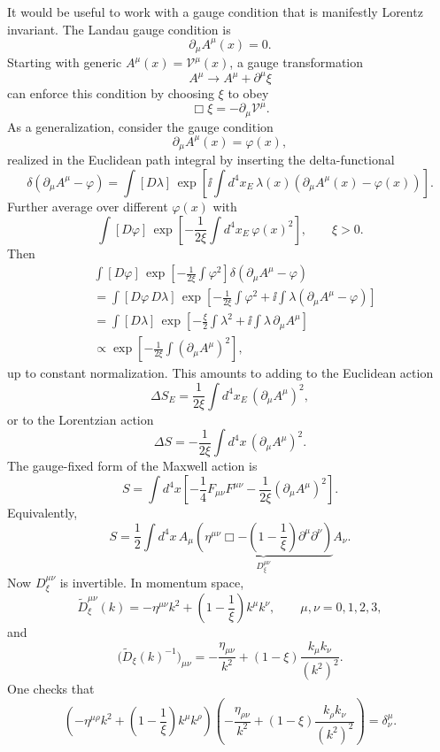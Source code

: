 It would be useful to work with a gauge condition that is manifestly
Lorentz invariant.  The Landau gauge condition is
\[
  \partial_\mu A^\mu(x)=0.
\]
Starting with generic \(A^\mu(x)=\mathcal V^\mu(x)\), a gauge
transformation
\[
  A^\mu\to A^\mu+\partial^\mu\xi
\]
can enforce this condition by choosing \(\xi\) to obey
\[
  \Box\xi=-\partial_\mu\mathcal V^\mu.
\]
As a generalization, consider the gauge condition
\[
  \partial_\mu A^\mu(x)=\varphi(x),
\]
realized in the Euclidean path integral by inserting the delta-functional
\[
  \delta(\partial_\mu A^\mu-\varphi)
  =
  \int[D\lambda]\,
  \exp\left[
    \ii\int d^4x_E\,
    \lambda(x)(\partial_\mu A^\mu(x)-\varphi(x))
  \right].
\]
Further average over different \(\varphi(x)\) with
\[
  \int[D\varphi]\,
  \exp\left[
    -\frac{1}{2\xi}
    \int d^4x_E\,\varphi(x)^2
  \right],
  \qquad \xi>0.
\]
Then
\[
\begin{aligned}
  &\int[D\varphi]\,
  \exp\left[-\frac{1}{2\xi}\int\varphi^2\right]
  \delta(\partial_\mu A^\mu-\varphi)
\\
  &=
  \int[D\varphi\,D\lambda]\,
  \exp\left[
    -\frac{1}{2\xi}\int\varphi^2
    +\ii\int\lambda(\partial_\mu A^\mu-\varphi)
  \right]
\\
  &=
  \int[D\lambda]\,
  \exp\left[
    -\frac{\xi}{2}\int\lambda^2
    +\ii\int\lambda\,\partial_\mu A^\mu
  \right]
\\
  &\propto
  \exp\left[
    -\frac{1}{2\xi}
    \int(\partial_\mu A^\mu)^2
  \right],
\end{aligned}
\]
up to constant normalization.  This amounts to adding to the Euclidean
action
\[
  \Delta S_E
  =
  \frac{1}{2\xi}
  \int d^4x_E\,(\partial_\mu A^\mu)^2,
\]
or to the Lorentzian action
\[
  \Delta S
  =
  -\frac{1}{2\xi}
  \int d^4x\,(\partial_\mu A^\mu)^2.
\]
The gauge-fixed form of the Maxwell action is
\[
  S=
  \int d^4x
  \left[
    -\frac14 F_{\mu\nu}F^{\mu\nu}
    -\frac{1}{2\xi}(\partial_\mu A^\mu)^2
  \right].
\]
Equivalently,
\[
  S
  =
  \frac12\int d^4x\,
  A_\mu
  \underbrace{
    \left(
      \eta^{\mu\nu}\Box
      -\left(1-\frac1\xi\right)\partial^\mu\partial^\nu
    \right)
  }_{D_\xi^{\mu\nu}}
  A_\nu.
\]
Now \(D_\xi^{\mu\nu}\) is invertible.  In momentum space,
\[
  \widetilde D_\xi^{\mu\nu}(k)
  =
  -\eta^{\mu\nu}k^2
  +\left(1-\frac1\xi\right)k^\mu k^\nu,
  \qquad
  \mu,\nu=0,1,2,3,
\]
and
\[
  \bigl(\widetilde D_\xi(k)^{-1}\bigr)_{\mu\nu}
  =
  -\frac{\eta_{\mu\nu}}{k^2}
  +(1-\xi)\frac{k_\mu k_\nu}{(k^2)^2}.
\]
One checks that
\[
  \left(
    -\eta^{\mu\rho}k^2
    +\left(1-\frac1\xi\right)k^\mu k^\rho
  \right)
  \left(
    -\frac{\eta_{\rho\nu}}{k^2}
    +(1-\xi)\frac{k_\rho k_\nu}{(k^2)^2}
  \right)
  =
  \delta^\mu_\nu.
\]

